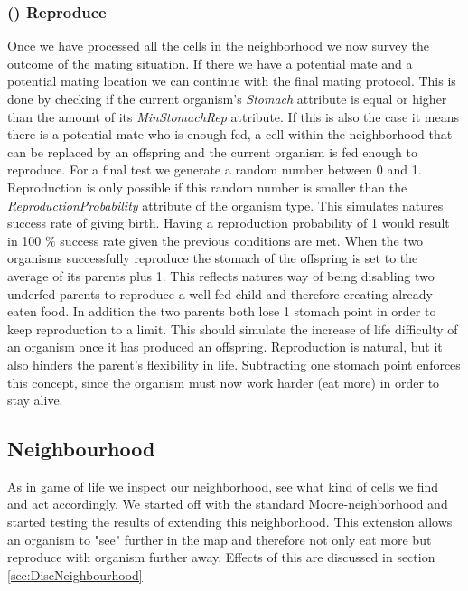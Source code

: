 \documentclass[11pt]{article}
\begin{document}
\addtocounter{protocolCounter}{1}
\subsubsection{() Reproduce}
\label{tab:reproduction}
Once we have processed all the cells in the neighborhood we now survey the outcome of the mating situation. If there we have a potential mate and a potential mating location we can continue with the final mating protocol. This is done by checking if the current organism's {\it Stomach} attribute is equal or higher than the amount of its {\it MinStomachRep} attribute. If this is also the case it means there is a potential mate who is enough fed, a cell within the neighborhood that can be replaced by an offspring and the current organism is fed enough to reproduce. For a final test we generate a random number between 0 and 1. Reproduction is only possible if this random number is smaller than the {\it ReproductionProbability} attribute of the organism type. This simulates natures success rate of giving birth. Having a reproduction probability of 1 would result in 100 $\%$ success rate given the previous conditions are met. When the two organisms successfully reproduce the stomach of the offspring is set to the average of its parents plus 1. This reflects natures way of being disabling two underfed parents to reproduce a well-fed child and therefore creating already eaten food. In addition the two parents both lose 1 stomach point in order to keep reproduction to a limit. This should simulate the increase of life difficulty of an organism once it has produced an offspring. Reproduction is natural, but it also hinders the parent's flexibility in life. Subtracting one stomach point enforces this concept, since the organism must now work harder (eat more) in order to stay alive.

 
\subsection{Neighbourhood}
\label{sec:neighbourhood}
As in game of life we inspect our neighborhood, see what kind of cells we find and act accordingly. 
We started off with the standard Moore-neighborhood and started testing the results of extending this neighborhood. This extension allows an organism to "see" further in the map and therefore not only eat more but reproduce with organism further away. Effects of this are discussed in section \ref{sec:DiscNeighbourhood}
\end{document}
